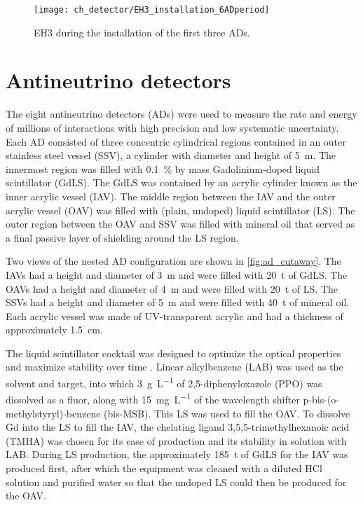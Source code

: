 \begin{figure}
    \centering
    \texttt{[image: ch\_detector/EH3\_installation\_6ADperiod]}
    \caption[View of EH3]{EH3 during the installation of the first three ADs.}
    \label{fig:eh3_wp_photo}
\end{figure}

\section{Antineutrino detectors}

The eight antineutrino detectors (ADs) were used to measure
the rate and energy of millions of \nuebar{} interactions with high precision
and low systematic uncertainty.
Each AD consisted of three concentric cylindrical regions
contained in an outer stainless steel vessel (SSV),
a cylinder with diameter and height of \SI{5}{\m}.
The innermost region was filled with \SI{0.1}{\percent} by mass
Gadolinium-doped liquid scintillator (GdLS).
The GdLS was contained by an acrylic cylinder known as the inner acrylic vessel (IAV).
The middle region between the IAV and the outer acrylic vessel (OAV) was filled
with (plain, undoped) liquid scintillator (LS).
The outer region between the OAV and SSV was filled with mineral oil
that served as a final passive layer of shielding around the LS region.

Two views of the nested AD configuration are shown in \cref{fig:ad_cutaway}.
The IAVs had a height and diameter of \SI{3}{\m} and were filled with \SI{20}{\tonne}
of GdLS.
The OAVs had a height and diameter of \SI{4}{\m} and were filled with \SI{20}{\tonne}
of LS.
The SSVs had a height and diameter of \SI{5}{\m} and were filled with \SI{40}{\tonne}
of mineral oil.
Each acrylic vessel was made of UV-transparent acrylic
and had a thickness of approximately \SI{1.5}{\cm}.

The liquid scintillator cocktail was designed to optimize the optical properties
and maximize stability over time \cite{gdls2014}.
Linear alkylbenzene (LAB) was used as the solvent and \nuebar{} target,
into which \SI{3}{\g\per\liter} of 2,5-diphenyloxazole (PPO)
was dissolved as a fluor,
along with \SI{15}{\mg\per\liter} of the wavelength shifter
p-bis-(o-methylstyryl)-benzene (bis-MSB).
This LS was used to fill the OAV.
To dissolve Gd into the LS to fill the IAV, the chelating ligand
3,5,5-trimethylhexanoic acid (TMHA) was chosen for its ease of production
and its stability in solution with LAB.
During LS production, the approximately \SI{185}{\tonne} of GdLS for the IAV
was produced first,
after which the equipment was cleaned with a diluted HCl solution and purified water
so that the undoped LS could then be produced for the OAV.

